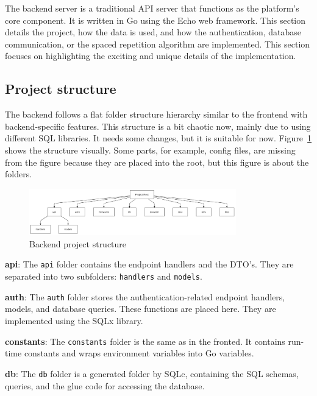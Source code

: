 The backend server is a traditional API server that functions as the platform's core component. It is written in Go using the Echo web framework. This section details the project, how the data is used, and how the authentication, database communication, or the spaced repetition algorithm are implemented. This section focuses on highlighting the exciting and unique details of the implementation.

\subsection{Project structure}

The backend follows a flat folder structure hierarchy similar to the frontend with backend-specific features. This structure is a bit chaotic now, mainly due to using different SQL libraries. It needs some changes, but it is suitable for now. Figure~\ref{fig:backend-project-structure} shows the structure visually. Some parts, for example, config files, are missing from the figure because they are placed into the root, but this figure is about the folders.

\begin{figure}[H]
	\centering
	\includegraphics[width=0.8\textwidth, keepaspectratio]{figures/backend-project-structure.png}
	\caption{Backend project structure}
	\label{fig:backend-project-structure}
\end{figure}

\textbf{api}: The \texttt{api} folder contains the endpoint handlers and the DTO's. They are separated into two subfolders: \texttt{handlers} and \texttt{models}.

\textbf{auth}: The \texttt{auth} folder stores the authentication-related endpoint handlers, models, and database queries. These functions are placed here. They are implemented using the SQLx library.

\textbf{constants}: The \texttt{constants} folder is the same as in the fronted. It contains run-time constants and wraps environment variables into Go variables.

\textbf{db}: The \texttt{db} folder is a generated folder by SQLc, containing the SQL schemas, queries, and the glue code for accessing the database.

